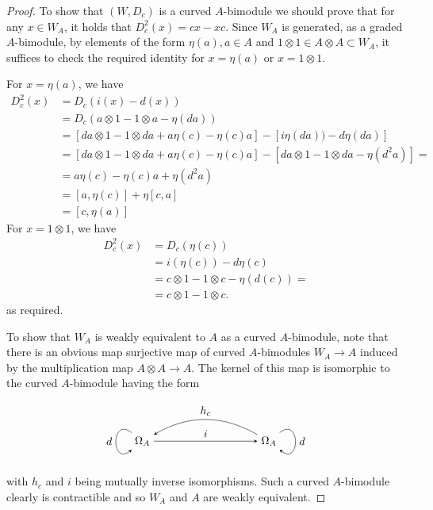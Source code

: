 \documentclass[10pt,a4paper]{amsart}
\begin{document}
\begin{proof}
	To show that $(W,D_c)$ is a curved $A$-bimodule we should prove that for any $x\in W_A$, it holds that $D^2_c(x)=cx-xc$. Since $W_A$ is generated, as a graded $A$-bimodule, by elements of the form $\eta(a), a\in A$ and $1\otimes 1\in A\otimes A\subset W_A$, it suffices to check the required identity for $x=\eta(a)$ or $x=1\otimes 1$.
	
	For $x=\eta(a)$, we have
	\begin{align*}
		D^2_c(x)&=D_c(i(x)-d(x))\\&=D_c(a\otimes 1-1\otimes a-\eta(da))\\
		&=[da\otimes 1-1\otimes da+a\eta(c)-\eta(c)a]-[i\eta(da))-d\eta(da)]\\
		&=[da\otimes 1-1\otimes da+a\eta(c)-\eta(c)a]-[da\otimes 1-1\otimes da-\eta(d^2a)]=\\
		&=a\eta(c)-\eta(c)a+\eta(d^2a)\\
		&=[a,\eta(c)]+\eta[c,a]\\
		&=[c,\eta(a)]
	\end{align*}
	For $x=1\otimes 1$, we have
	\begin{align*}
		D^2_c(x)&=D_c(\eta(c))\\
		&=i(\eta(c))-d\eta(c)\\
		&=c\otimes 1-1\otimes c-\eta(d(c))=\\
		&=c\otimes 1-1\otimes c.
	\end{align*}
	as required.
	
	To show that $W_A$ is weakly equivalent to $A$ as a curved $A$-bimodule, note that there is an obvious map surjective map of curved $A$-bimodules $W_A\to A$ induced by the multiplication map $A\otimes A\to A$. The kernel of this map is isomorphic to the curved $A$-bimodule having the form
	
	\[
	\begin{tikzpicture}[>=stealth, baseline=(current bounding box.center)]
		\node (L) at (0,0) {$\Omega_A$};
		\node (R) at (4,0) {$\Omega_A$};
		
		\draw[->] (L) -- node[above] {$i$} (R);
		
		\draw[->] (R) to[out=150,in=30] node[above] {$h_c$}  (L);
		
		\draw[->]
		(L) .. controls +(-1,0.8) and +(-1,-0.8) ..
		node[left] {$d$} (L);
		
		\draw[->]
		(R) .. controls +(1,0.8) and +(1,-0.8) ..
		node[right] {$d$} (R);
	\end{tikzpicture}
	\]
	with $h_c$ and $i$ being mutually inverse isomorphisms. Such a curved $A$-bimodule clearly is contractible and so $W_A$ and $A$ are weakly equivalent.
\end{proof}
\end{document}
